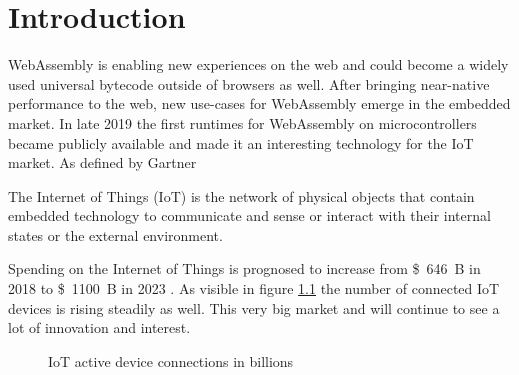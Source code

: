 
\chapter{Introduction}\label{chapter:introduction}

WebAssembly is enabling new experiences on the web and could become a widely used universal bytecode outside of browsers as well. After bringing near-native performance to the web, new use-cases for WebAssembly emerge in the embedded market. In late 2019 the first runtimes for WebAssembly on microcontrollers became publicly available and made it an interesting technology for the IoT market. As defined by Gartner \autocite{gartner_internet_nodate}
\begin{displayquote}
    The Internet of Things (IoT) is the network of physical objects that contain embedded technology to communicate and sense or interact with their internal states or the external environment.
\end{displayquote}

Spending on the Internet of Things is prognosed to increase from \SI{646}[\$]{B} in 2018 to \SI{1100}[\$]{B} in 2023 \autocite{idc_prognosis_2019}. As visible in figure \ref{fig:iot_connections} the number of connected IoT devices is rising steadily as well. This very big market \autocite{gartner_internet_nodate-1} and will continue to see a lot of innovation and interest.

\begin{figure}[h]
    \caption{IoT active device connections in billions \autocite{iot_analytics_internet_2018}}
    \label{fig:iot_connections}
\end{figure}

